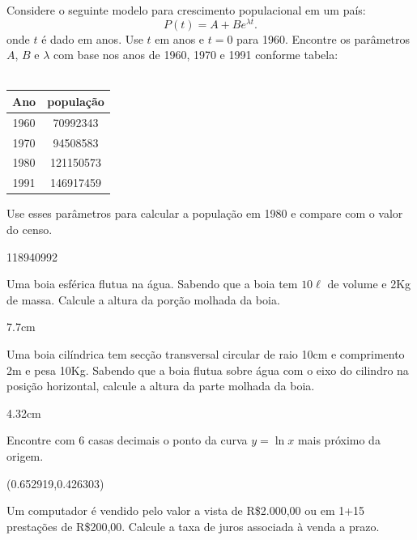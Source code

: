 \begin{Exercise}\label{pop} Considere o seguinte modelo para crescimento populacional em um país:
$$P(t)=A+Be^{\lambda t}.$$
onde $t$ é dado em anos. Use $t$ em anos e $t=0$ para 1960. Encontre os parâmetros $A$, $B$ e $\lambda$ com base nos anos de 1960, 1970 e 1991 conforme tabela:\\~

\begin{tabular}{|c|c|}
\hline
Ano & população\\
\hline
1960&70992343\\
1970&94508583\\
1980&121150573\\
1991&146917459\\
\hline	
\end{tabular}

Use esses parâmetros para calcular a população em 1980 e compare com o valor do censo.
\end{Exercise}
\begin{Answer}
 118940992
\end{Answer}

\begin{Exercise}[title=Fluidos]\label{boiaesf} Uma boia esférica flutua na água. Sabendo que a boia tem $10\ell$ de volume e 2Kg de massa. Calcule a altura da porção molhada da boia.
\end{Exercise}
\begin{Answer}
 7.7cm
\end{Answer}

\begin{Exercise}[title= Fluidos]\label{boiacil} Uma boia cilíndrica tem secção transversal circular de raio 10cm e comprimento 2m e pesa 10Kg. Sabendo que a boia flutua sobre água com o eixo do cilindro na posição horizontal, calcule a altura da parte molhada da boia.
\end{Exercise}
\begin{Answer}
 4.32cm
\end{Answer}

\begin{Exercise} Encontre com 6 casas decimais o ponto da curva $y=\ln x$ mais próximo da origem.
\end{Exercise}
\begin{Answer}
(0.652919,0.426303)
\end{Answer}


\begin{Exercise}[title= Matemática financeira] Um computador é vendido pelo valor a vista de R\$2.000,00 ou em 1+15 prestações de R\$200,00. Calcule a taxa de juros associada à venda a prazo.
\end{Exercise}

